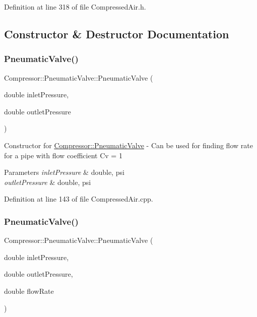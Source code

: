 Definition at line 318 of file Compressed\+Air.\+h.



\subsection{Constructor \& Destructor Documentation}
\mbox{\label{class_compressor_1_1_pneumatic_valve_a8c883ff13640780f40d026984e9116f7}} 
\subsubsection{\texorpdfstring{Pneumatic\+Valve()}{PneumaticValve()}\hspace{0.1cm}{\footnotesize\ttfamily [1/6]}}
{\footnotesize\ttfamily Compressor\+::\+Pneumatic\+Valve\+::\+Pneumatic\+Valve (\begin{DoxyParamCaption}\item[{double}]{inlet\+Pressure,  }\item[{double}]{outlet\+Pressure }\end{DoxyParamCaption})}

Constructor for \hyperlink{class_compressor_1_1_pneumatic_valve}{Compressor\+::\+Pneumatic\+Valve} -\/ Can be used for finding flow rate for a pipe with flow coefficient Cv = 1 
\begin{DoxyParams}{Parameters}
{\em inlet\+Pressure} & double, psi \\
\hline
{\em outlet\+Pressure} & double, psi \\
\hline
\end{DoxyParams}


Definition at line 143 of file Compressed\+Air.\+cpp.

\mbox{\label{class_compressor_1_1_pneumatic_valve_adc3d621e933c23b13d1f20378704336b}} 
\subsubsection{\texorpdfstring{Pneumatic\+Valve()}{PneumaticValve()}\hspace{0.1cm}{\footnotesize\ttfamily [2/6]}}
{\footnotesize\ttfamily Compressor\+::\+Pneumatic\+Valve\+::\+Pneumatic\+Valve (\begin{DoxyParamCaption}\item[{double}]{inlet\+Pressure,  }\item[{double}]{outlet\+Pressure,  }\item[{double}]{flow\+Rate }\end{DoxyParamCaption})}

